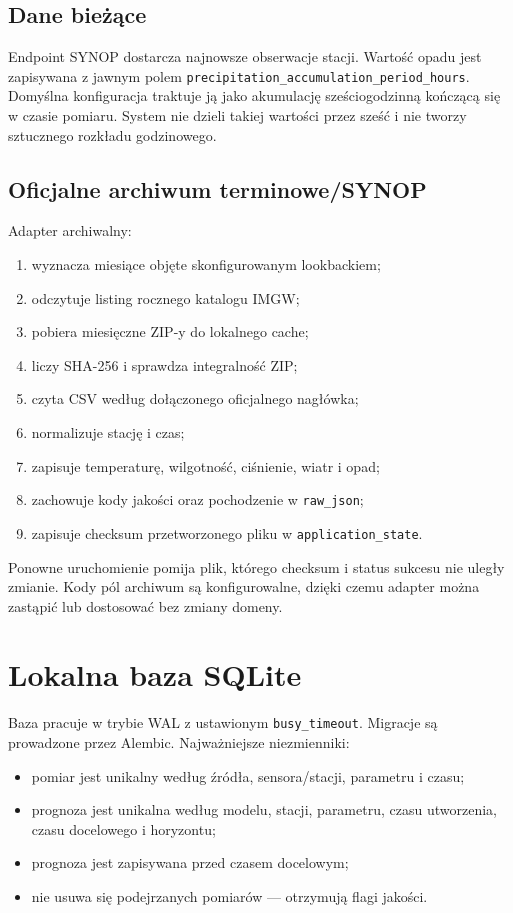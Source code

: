 \documentclass[11pt,a4paper,oneside]{article}
\begin{document}
\subsection{Dane bieżące}

Endpoint SYNOP dostarcza najnowsze obserwacje stacji. Wartość opadu jest
zapisywana z jawnym polem
\texttt{precipitation\_accumulation\_period\_hours}. Domyślna konfiguracja
traktuje ją jako akumulację sześciogodzinną kończącą się w czasie pomiaru.
System nie dzieli takiej wartości przez sześć i nie tworzy sztucznego rozkładu
godzinowego.

\subsection{Oficjalne archiwum terminowe/SYNOP}

Adapter archiwalny:
\begin{enumerate}
  \item wyznacza miesiące objęte skonfigurowanym lookbackiem;
  \item odczytuje listing rocznego katalogu IMGW;
  \item pobiera miesięczne ZIP-y do lokalnego cache;
  \item liczy SHA-256 i sprawdza integralność ZIP;
  \item czyta CSV według dołączonego oficjalnego nagłówka;
  \item normalizuje stację i czas;
  \item zapisuje temperaturę, wilgotność, ciśnienie, wiatr i opad;
  \item zachowuje kody jakości oraz pochodzenie w \texttt{raw\_json};
  \item zapisuje checksum przetworzonego pliku w
        \texttt{application\_state}.
\end{enumerate}

Ponowne uruchomienie pomija plik, którego checksum i status sukcesu nie
uległy zmianie. Kody pól archiwum są konfigurowalne, dzięki czemu adapter można
zastąpić lub dostosować bez zmiany domeny.

\section{Lokalna baza SQLite}

Baza pracuje w trybie WAL z ustawionym \texttt{busy\_timeout}. Migracje są
prowadzone przez Alembic. Najważniejsze niezmienniki:
\begin{itemize}[nosep]
  \item pomiar jest unikalny według źródła, sensora/stacji, parametru i czasu;
  \item prognoza jest unikalna według modelu, stacji, parametru, czasu
        utworzenia, czasu docelowego i horyzontu;
  \item prognoza jest zapisywana przed czasem docelowym;
  \item nie usuwa się podejrzanych pomiarów --- otrzymują flagi jakości.
\end{itemize}
\end{document}

